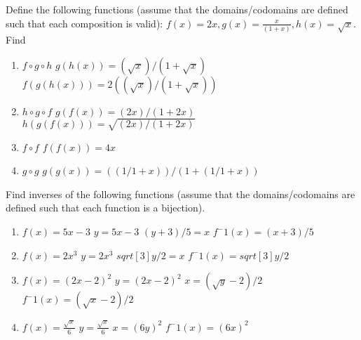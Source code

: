 \documentclass[10pt]{exam}
\begin{document}
\begin{questions}


\question[8] Define the following functions (assume that the
domains/codomains are defined such that each composition is valid):
$f(x) = 2x, g(x) = \frac{x}{(1+x)}, h(x) = \sqrt{x}$. Find
\begin{enumerate} [label=(\alph*)]
 \item $f\circ g \circ h$
  \newline $g(h(x)) = (\sqrt{x})/(1+\sqrt{x})$
 \newline $f(g(h(x))) = 2((\sqrt{x})/(1+\sqrt{x}))$
 \item $h \circ g \circ f$
 \newline $g(f(x)) = (2x)/(1+2x)$
 \newline $h(g(f(x))) = \sqrt{(2x)/(1+2x)}$
 \item $f \circ f$
 \newline $f(f(x)) = 4x$
 \item $g \circ g$
 \newline $g(g(x)) = ((1/1+x))/(1+(1/1+x))$
\end{enumerate}

\question[8] Find inverses of the following functions (assume
that the domains/codomains are defined such that each function is a
bijection).
\begin{enumerate} [label=(\alph*)]
 \item $f(x) = 5x - 3$
 \newline $y = 5x - 3$
 \newline $(y+3)/5 = x$
 \newline $f^-1(x) = (x+3)/5$
 \item $f(x) = 2x^3$
 \newline $y = 2x^3$
 \newline $sqrt[3]{y/2}=x$
 \newline $f^-1(x) = sqrt[3]{y/2}$
 \item $f(x) = (2x - 2)^2$
 \newline $y = (2x-2)^2$
 \newline $x = (\sqrt{y} - 2)/2$
 \newline $f^-1(x) = (\sqrt{x} - 2)/2$
 \item $f(x) = \frac{\sqrt{x}}{6}$
 \newline $y = \frac{\sqrt{x}}{6}$
 \newline $x = (6y)^2$
 \newline $f^-1(x) = (6x)^2$
 \end{enumerate}


\end{questions}
\end{document}
